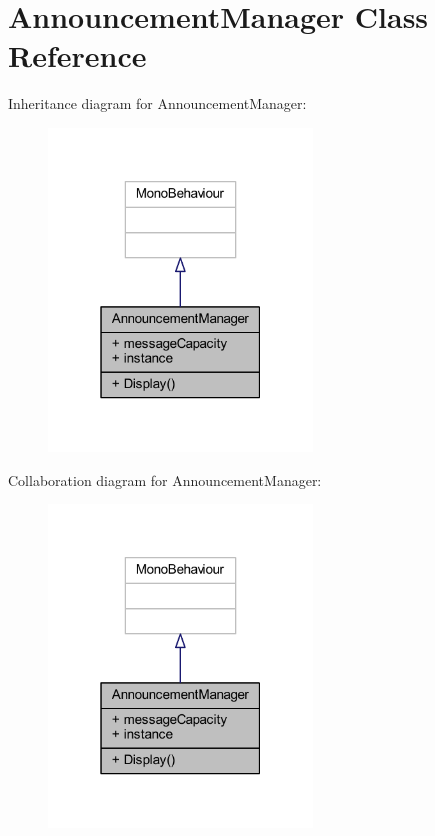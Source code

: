 \hypertarget{class_announcement_manager}{}\section{Announcement\+Manager Class Reference}
\label{class_announcement_manager}


Inheritance diagram for Announcement\+Manager\+:
\nopagebreak
\begin{figure}[H]
\begin{center}
\leavevmode
\includegraphics[width=199pt]{class_announcement_manager__inherit__graph}
\end{center}
\end{figure}


Collaboration diagram for Announcement\+Manager\+:
\nopagebreak
\begin{figure}[H]
\begin{center}
\leavevmode
\includegraphics[width=199pt]{class_announcement_manager__coll__graph}
\end{center}
\end{figure}

